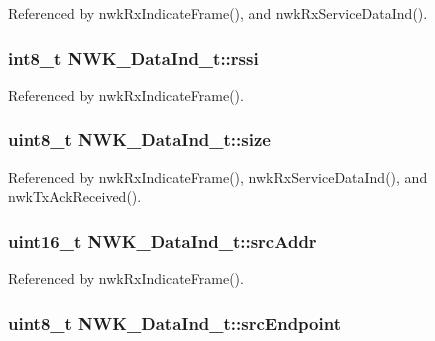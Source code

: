 Referenced by nwk\-Rx\-Indicate\-Frame(), and nwk\-Rx\-Service\-Data\-Ind().

\hypertarget{struct_n_w_k___data_ind__t_af1caf9632bf2425ab22ecd540204a190}{
\subsubsection[{rssi}]{\setlength{\rightskip}{0pt plus 5cm}int8\-\_\-t N\-W\-K\-\_\-\-Data\-Ind\-\_\-t\-::rssi}}\label{struct_n_w_k___data_ind__t_af1caf9632bf2425ab22ecd540204a190}


Referenced by nwk\-Rx\-Indicate\-Frame().

\hypertarget{struct_n_w_k___data_ind__t_a73c2dc888e0d42b76e23842054f7b179}{
\subsubsection[{size}]{\setlength{\rightskip}{0pt plus 5cm}uint8\-\_\-t N\-W\-K\-\_\-\-Data\-Ind\-\_\-t\-::size}}\label{struct_n_w_k___data_ind__t_a73c2dc888e0d42b76e23842054f7b179}


Referenced by nwk\-Rx\-Indicate\-Frame(), nwk\-Rx\-Service\-Data\-Ind(), and nwk\-Tx\-Ack\-Received().

\hypertarget{struct_n_w_k___data_ind__t_a4105835ce35320f6ed3da328563d165b}{
\subsubsection[{src\-Addr}]{\setlength{\rightskip}{0pt plus 5cm}uint16\-\_\-t N\-W\-K\-\_\-\-Data\-Ind\-\_\-t\-::src\-Addr}}\label{struct_n_w_k___data_ind__t_a4105835ce35320f6ed3da328563d165b}


Referenced by nwk\-Rx\-Indicate\-Frame().

\hypertarget{struct_n_w_k___data_ind__t_a7c818ed76491eb59d09aa7be7bf46a72}{
\subsubsection[{src\-Endpoint}]{\setlength{\rightskip}{0pt plus 5cm}uint8\-\_\-t N\-W\-K\-\_\-\-Data\-Ind\-\_\-t\-::src\-Endpoint}}\label{struct_n_w_k___data_ind__t_a7c818ed76491eb59d09aa7be7bf46a72}


